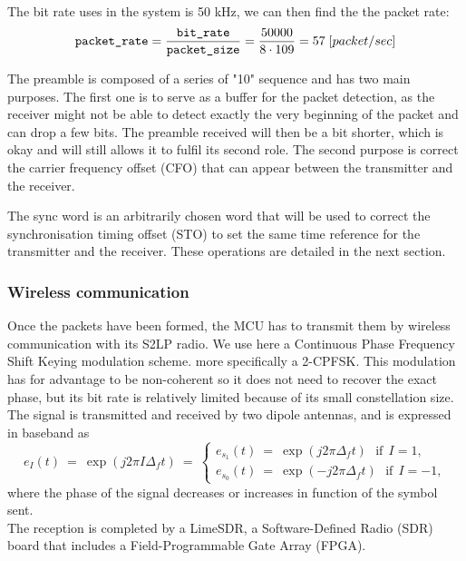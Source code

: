 \documentclass{article}
\begin{document}
The bit rate uses in the system is 50 kHz, we can then find the the packet rate:
\begin{equation}
    \texttt{packet\_rate} = \frac{\texttt{bit\_rate}}{\texttt{packet\_size}} = \frac{50000}{8 \cdot 109} = 57 \hspace{0.1cm} [packet/sec]
\end{equation}

The preamble is composed of a series of "10" sequence and has two main purposes. The first one is to serve as a buffer for the packet detection, as the receiver might not be able to detect exactly the very beginning of the packet and can drop a few bits. The preamble received will then be a bit shorter, which is okay and will still allows it to fulfil its second role. The second purpose is correct the carrier frequency offset (CFO) that can appear between the transmitter and the receiver. 

The sync word is an arbitrarily chosen word that will be used to correct the synchronisation timing offset (STO) to set the same time reference for the transmitter and the receiver. These operations are detailed in the next section.


\subsubsection{Wireless communication}

Once the packets have been formed, the MCU has to transmit them by wireless communication with its S2LP radio. We use here a Continuous Phase Frequency Shift Keying modulation scheme. more specifically a 2-CPFSK. This modulation has for advantage to be non-coherent so it does not need to recover the exact phase, but its bit rate is relatively limited because of its small constellation size. The signal is transmitted and received by two dipole antennas, and is expressed in baseband as 
\begin{equation*}
    e_I(t)\:=\:\exp{\left(j 2\pi I \Delta_f t \right)}\:=\:\begin{cases}
    e_{s_1}(t)\:=\:\exp{\left(j 2\pi \Delta_f t \right)}\:\:\:\text{if}\:\: I=1,\\
    e_{s_0}(t)\:=\:\exp{\left(-j 2\pi \Delta_f t \right)}\:\:\:\text{if}\:\: I=-1,
    \end{cases}
\end{equation*}
where the phase of the signal decreases or increases in function of the symbol sent. \\
The reception is completed by a LimeSDR, a Software-Defined Radio (SDR) board that includes a Field-Programmable Gate Array (FPGA). 
\end{document}
